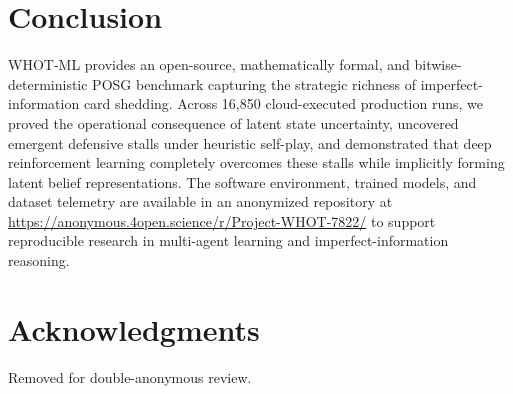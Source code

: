 \documentclass[journal]{IEEEtran}
\begin{document}
\section{Conclusion}
WHOT-ML provides an open-source, mathematically formal, and bitwise-deterministic POSG benchmark capturing the strategic richness of imperfect-information card shedding. Across 16,850 cloud-executed production runs, we proved the operational consequence of latent state uncertainty, uncovered emergent defensive stalls under heuristic self-play, and demonstrated that deep reinforcement learning completely overcomes these stalls while implicitly forming latent belief representations. The software environment, trained models, and dataset telemetry are available in an anonymized repository at \url{https://anonymous.4open.science/r/Project-WHOT-7822/} to support reproducible research in multi-agent learning and imperfect-information reasoning.

\section*{Acknowledgments}
Removed for double-anonymous review.



\end{document}
